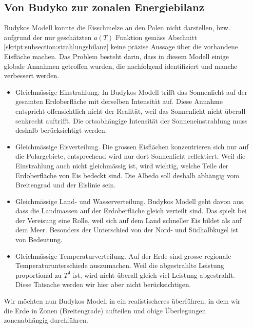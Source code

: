 \begin{refsection}
\section{Von Budyko zur zonalen Energiebilanz}
Budykos Modell konnte die Eisschmelze an den Polen nicht darstellen, bzw. aufgrund der nur geschätzten $a(T)$ Funktion gemäss Abschnitt \ref{skript:subsection:strahlungsbilanz} keine präzise Aussage über die vorhandene Eisfläche machen. Das Problem besteht darin, dass in diesem Modell einige globale Annahmen getroffen wurden, die nachfolgend identifiziert und manche verbessert werden.
\begin{itemize}
	\item Gleichmässige Einstrahlung. In Budykos Modell trifft das Sonnenlicht auf der gesamten Erdoberfläche mit derselben Intensität auf. Diese Annahme entspricht offensichtlich nicht der Realität, weil das Sonnenlicht nicht überall senkrecht auftrifft. Die ortsabhängige Intensität der Sonneneinstrahlung muss deshalb berücksichtigt werden.
	\item Gleichmässige Eisverteilung. Die grossen Eisflächen konzentrieren sich nur auf die Polargebiete, entsprechend wird nur dort Sonnenlicht reflektiert. Weil die Einstrahlung auch nicht gleichmässig ist, wird wichtig, welche Teile der Erdoberfläche von Eis bedeckt sind. Die Albedo soll deshalb abhängig vom Breitengrad und der Eislinie sein.
	\item Gleichmässige Land- und Wasserverteilung. Budykos Modell geht davon aus, dass die Landmassen auf der Erdoberfläche gleich verteilt sind. Das spielt bei der Vereisung eine Rolle, weil sich auf dem Land schneller Eis bildet als auf dem Meer. Besonders der Unterschied von der Nord- und Südhalbkugel ist von Bedeutung.
	\item Gleichmässige Temperaturverteilung. Auf der Erde sind grosse regionale Temperaturunterschiede auszumachen. Weil die abgestrahlte Leistung proportional zu $T^4$ ist, wird nicht überall gleich viel Leistung abgestrahlt. Diese Tatsache werden wir hier aber nicht berücksichtigen.
\end{itemize}
Wir möchten nun Budykos Modell in ein realistischeres überführen, in dem wir die Erde in Zonen (Breitengrade) aufteilen und obige Überlegungen zonenabhängig durchführen.

\end{refsection}
